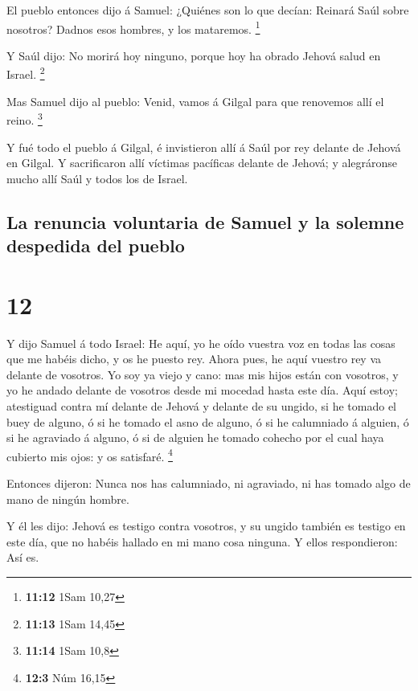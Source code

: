  El pueblo entonces dijo á Samuel: ¿Quiénes son lo que
decían: Reinará Saúl sobre nosotros? Dadnos esos hombres, y los
mataremos. \footnote{\textbf{11:12} 1Sam 10,27}

 Y Saúl dijo: No morirá hoy ninguno, porque hoy ha obrado
Jehová salud en Israel. \footnote{\textbf{11:13} 1Sam 14,45}

 Mas Samuel dijo al pueblo: Venid, vamos á Gilgal para que
renovemos allí el reino. \footnote{\textbf{11:14} 1Sam 10,8}

 Y fué todo el pueblo á Gilgal, é invistieron allí á Saúl
por rey delante de Jehová en Gilgal. Y sacrificaron allí víctimas
pacíficas delante de Jehová; y alegráronse mucho allí Saúl y todos los
de Israel.

\hypertarget{la-renuncia-voluntaria-de-samuel-y-la-solemne-despedida-del-pueblo}{%
\subsection{La renuncia voluntaria de Samuel y la solemne despedida del
pueblo}\label{la-renuncia-voluntaria-de-samuel-y-la-solemne-despedida-del-pueblo}}

\hypertarget{section-11}{%
\section{12}\label{section-11}}

 Y dijo Samuel á todo Israel: He aquí, yo he oído vuestra
voz en todas las cosas que me habéis dicho, y os he puesto rey.
 Ahora pues, he aquí vuestro rey va delante de vosotros. Yo
soy ya viejo y cano: mas mis hijos están con vosotros, y yo he andado
delante de vosotros desde mi mocedad hasta este día.  Aquí
estoy; atestiguad contra mí delante de Jehová y delante de su ungido, si
he tomado el buey de alguno, ó si he tomado el asno de alguno, ó si he
calumniado á alguien, ó si he agraviado á alguno, ó si de alguien he
tomado cohecho por el cual haya cubierto mis ojos: y os satisfaré.
\footnote{\textbf{12:3} Núm 16,15}

 Entonces dijeron: Nunca nos has calumniado, ni agraviado,
ni has tomado algo de mano de ningún hombre.

 Y él les dijo: Jehová es testigo contra vosotros, y su
ungido también es testigo en este día, que no habéis hallado en mi mano
cosa ninguna. Y ellos respondieron: Así es.

